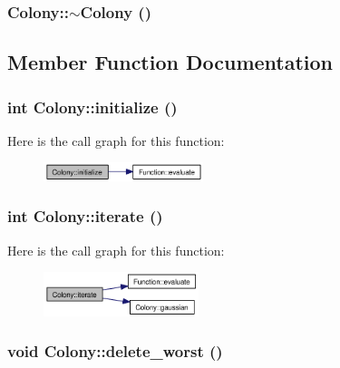 \hypertarget{classColony_9cebe4a25260c8da7c99d10b0dab5a4e}{
\subsubsection{\setlength{\rightskip}{0pt plus 5cm}Colony::$\sim$Colony ()}}
\label{classColony_9cebe4a25260c8da7c99d10b0dab5a4e}




\subsection{Member Function Documentation}
\hypertarget{classColony_c46a39e897255d72662ed9b1677bc91a}{
\subsubsection{\setlength{\rightskip}{0pt plus 5cm}int Colony::initialize ()}}
\label{classColony_c46a39e897255d72662ed9b1677bc91a}




Here is the call graph for this function:\nopagebreak
\begin{figure}[H]
\begin{center}
\leavevmode
\includegraphics[width=132pt]{classColony_c46a39e897255d72662ed9b1677bc91a_cgraph}
\end{center}
\end{figure}
\hypertarget{classColony_81a0f7680e31680188f40f5293510711}{
\subsubsection{\setlength{\rightskip}{0pt plus 5cm}int Colony::iterate ()}}
\label{classColony_81a0f7680e31680188f40f5293510711}




Here is the call graph for this function:\nopagebreak
\begin{figure}[H]
\begin{center}
\leavevmode
\includegraphics[width=128pt]{classColony_81a0f7680e31680188f40f5293510711_cgraph}
\end{center}
\end{figure}
\hypertarget{classColony_ca86ca3a2dcad9f2e98edfb449c6bbe2}{
\subsubsection{\setlength{\rightskip}{0pt plus 5cm}void Colony::delete\_\-worst ()}}
\label{classColony_ca86ca3a2dcad9f2e98edfb449c6bbe2}


